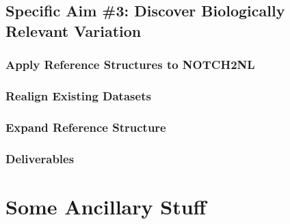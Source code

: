 \documentclass[11pt,proposal]{ucthesis}
\begin{document}
    


\section{Specific Aim \#3: Discover Biologically Relevant Variation}

\subsection{Apply Reference Structures to NOTCH2NL}

\subsection{Realign Existing Datasets}

\subsection{Expand Reference Structure}

\subsection{Deliverables}




    

\appendix
\chapter{Some Ancillary Stuff}
\end{document}
